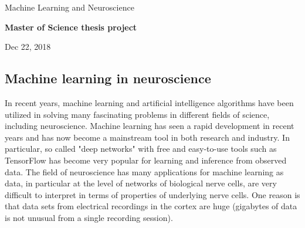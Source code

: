 \documentclass[%
oneside,                 %
final,                   %
10pt]{article}
\begin{document}

\newcommand{\exercisesection}[1]{\subsection*{#1}}






\thispagestyle{empty}

\begin{center}
{\LARGE\bf
\begin{spacing}{1.25}
Machine Learning and Neuroscience
\end{spacing}
}
\end{center}


\begin{center}
{\bf Master of Science thesis project${}^{}$} \\ [0mm]
\end{center}

\begin{center}
\end{center}
    

\begin{center}
Dec 22, 2018
\end{center}

\vspace{1cm}


\subsection{Machine learning in neuroscience}

In recent years, machine learning and artificial intelligence
algorithms have been utilized in solving many fascinating problems in
different fields of science, including neuroscience.  Machine learning
has seen a rapid development in recent years and has now become a
mainstream tool in both research and industry. In particular, so
called "deep networks" with free and easy-to-use tools such as
TensorFlow has become very popular for learning and inference from
observed data.  The field of neuroscience has many applications for
machine learning as data, in particular at the level of networks of
biological nerve cells, are very difficult to interpret in terms of
properties of underlying nerve cells. One reason is that data sets
from electrical recordings in the cortex are huge (gigabytes of data
is not unusual from a single recording session).
\end{document}
